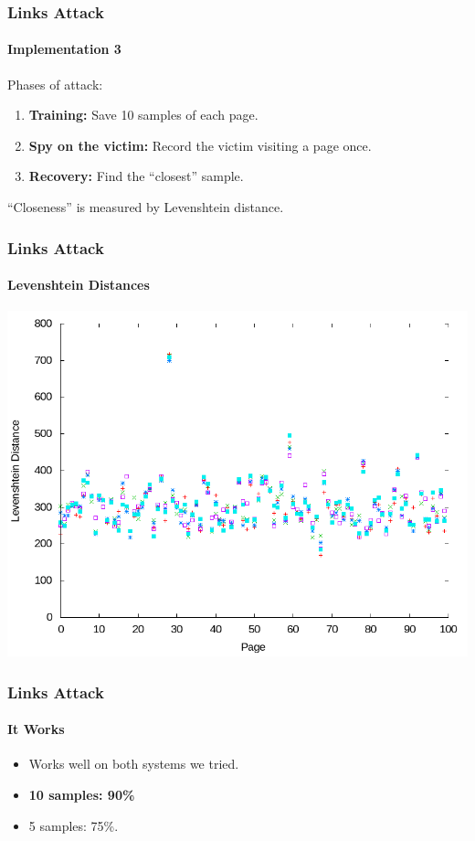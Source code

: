 \documentclass{beamer}
\begin{document}
\begin{frame}
    \frametitle{Links Attack}
    \framesubtitle{Implementation 3}

    Phases of attack:

    \begin{enumerate}
        \item \textbf{Training:} Save 10 samples of each page.
        \item \textbf{Spy on the victim:} Record the victim visiting a page once.
        \item \textbf{Recovery:} Find the ``closest'' sample.
    \end{enumerate}

    ``Closeness'' is measured by Levenshtein distance.
\end{frame}

\begin{frame}
    \frametitle{Links Attack}
    \framesubtitle{Levenshtein Distances}

    \includegraphics[width=\textwidth,keepaspectratio]{distanceplot.png}

\end{frame}

\begin{frame}
    \frametitle{Links Attack}
    \framesubtitle{It Works}

            \begin{itemize}
                \item Works well on both systems we tried.
                \item \textbf{10 samples: 90\%}
                \item 5 samples: 75\%.
            \end{itemize}
\end{frame}
\end{document}
